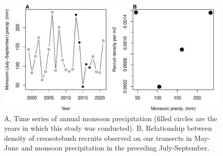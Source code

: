 \documentclass[11pt]{article}\usepackage[]{graphicx}\usepackage[usenames,dvipsnames]{xcolor}
\begin{document}
\newpage
\begin{figure}[H]
  \begin{center}
    \includegraphics[width=\linewidth]{Figures/monsoon_seedlings}
  \caption{A, Time series of annual monsoon precipitation (filled circles are the years in which this study was conducted). B, Relationship between density of creosotebush recruits observed on our transects in May-June and monsoon precipitation in the preceding July-September.}
  \label{fig:monsoon}
  \end{center}
\end{figure}
\end{document}

